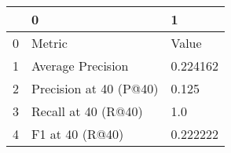 \begin{tabular}{lll}
\toprule
{} &                       0 &         1 \\
\midrule
0 &                  Metric &     Value \\
1 &       Average Precision &  0.224162 \\
2 &  Precision at 40 (P@40) &     0.125 \\
3 &     Recall at 40 (R@40) &       1.0 \\
4 &         F1 at 40 (R@40) &  0.222222 \\
\bottomrule
\end{tabular}
